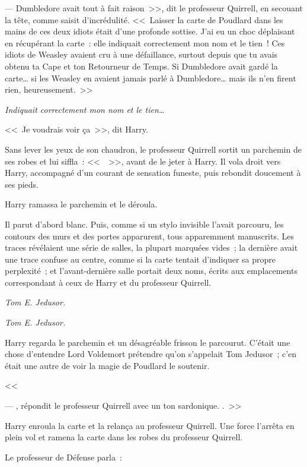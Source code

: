 --- Dumbledore avait tout à fait raison~>>, dit le professeur Quirrell, en secouant la tête, comme saisit d'incrédulité. <<~Laisser la carte de Poudlard dans les mains de ces deux idiots était d'une profonde sottise. J'ai eu un choc déplaisant en récupérant la carte~: elle indiquait correctement mon nom et le tien~! Ces idiots de Weasley avaient cru à une défaillance, surtout depuis que tu avais obtenu ta Cape et ton Retourneur de Temps. Si Dumbledore avait gardé la carte… si les Weasley en avaient jamais parlé à Dumbledore… mais ils n'en firent rien, heureusement.~>>

\emph{Indiquait correctement mon nom et le tien…}

<<~Je voudrais voir ça~>>, dit Harry.

Sans lever les yeux de son chaudron, le professeur Quirrell sortit un parchemin de ses robes et lui siffla~: <<~~>>, avant de le jeter à Harry. Il vola droit vers Harry, accompagné d'un courant de sensation funeste, puis rebondit doucement à ses pieds.

Harry ramassa le parchemin et le déroula.

Il parut d'abord blanc. Puis, comme si un stylo invisible l'avait parcouru, les contours des murs et des portes apparurent, tous apparemment manuscrits. Les traces révélaient une série de salles, la plupart marquées vides~; la dernière avait une trace confuse au centre, comme si la carte tentait d'indiquer sa propre perplexité~; et l'avant-dernière salle portait deux noms, écrits aux emplacements correspondant à ceux de Harry et du professeur Quirrell.

\emph{Tom E. Jedusor.}

\emph{Tom E. Jedusor.}

Harry regarda le parchemin et un désagréable frisson le parcourut. C'était une chose d'entendre Lord Voldemort prétendre qu'on s'appelait Tom Jedusor~; c'en était une autre de voir la magie de Poudlard le soutenir.

<<~

--- , répondit le professeur Quirrell avec un ton sardonique. .~>>

Harry enroula la carte et la relança au professeur Quirrell. Une force l'arrêta en plein vol et ramena la carte dans les robes du professeur Quirrell.

Le professeur de Défense parla~:

